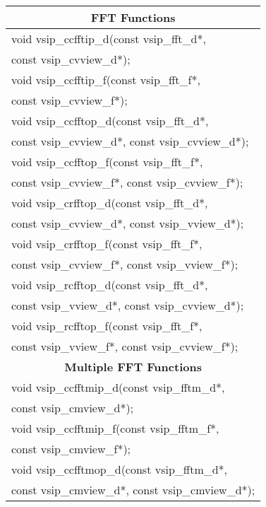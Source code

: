 \\ \hspace*{1.cm} {
\ttfamily
\begin{tabular}[H]{|l|}
\multicolumn{1}{c}{\rmfamily \bfseries FFT Functions}\\ \hline
void vsip\_ccfftip\_d(const vsip\_fft\_d*,\\*\hspace{.7cm}const vsip\_cvview\_d*);\\
void vsip\_ccfftip\_f(const vsip\_fft\_f*,\\*\hspace{.7cm} const vsip\_cvview\_f*);\\
void vsip\_ccfftop\_d(const vsip\_fft\_d*,\\*\hspace{.7cm} const vsip\_cvview\_d*, const vsip\_cvview\_d*);\\
void vsip\_ccfftop\_f(const vsip\_fft\_f*,\\*\hspace{.7cm} const vsip\_cvview\_f*, const vsip\_cvview\_f*);\\
void vsip\_crfftop\_d(const vsip\_fft\_d*,\\*\hspace{.7cm} const vsip\_cvview\_d*, const vsip\_vview\_d*);\\
void vsip\_crfftop\_f(const vsip\_fft\_f*,\\*\hspace{.7cm} const vsip\_cvview\_f*, const vsip\_vview\_f*);\\
void vsip\_rcfftop\_d(const vsip\_fft\_d*,\\*\hspace{.7cm} const vsip\_vview\_d*, const vsip\_cvview\_d*);\\
void vsip\_rcfftop\_f(const vsip\_fft\_f*,\\*\hspace{.7cm} const vsip\_vview\_f*, const vsip\_cvview\_f*);\\ \hline \multicolumn{1}{c}{\rmfamily \bfseries Multiple FFT Functions}\\\hline
void vsip\_ccfftmip\_d(const vsip\_fftm\_d*,\\*\hspace{.7cm} const vsip\_cmview\_d*);\\
void vsip\_ccfftmip\_f(const vsip\_fftm\_f*,\\*\hspace{.7cm} const vsip\_cmview\_f*);\\
void vsip\_ccfftmop\_d(const vsip\_fftm\_d*,\\*\hspace{.7cm} const vsip\_cmview\_d*, const vsip\_cmview\_d*);\\

\end{tabular}}
